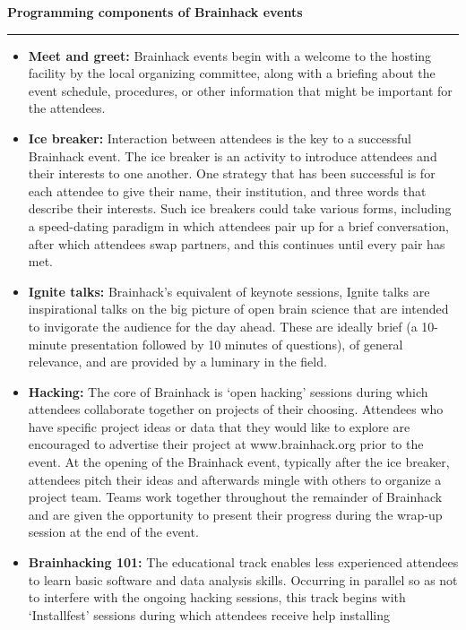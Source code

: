 \begin{table}[!ht]
\caption{{\bf Programming components of Brainhack events}\label{tab4}}
\hrule %
    \begin{itemize}
    \item
        \textbf{Meet and greet:} Brainhack events begin with a welcome to the hosting facility by the local organizing committee, along with a briefing about the event schedule, procedures, or other information that might be important for the attendees.
    \item
        \textbf{Ice breaker:} Interaction between attendees is the key to a successful Brainhack event. The ice breaker is an activity to introduce attendees and their interests %
to one another. One strategy that has been successful is for each attendee to give their name, their institution, and three words that describe their interests. Such ice breakers could take various forms, including a speed-dating paradigm in which attendees pair up for a brief conversation, after which attendees swap partners, and this continues until every pair has met.
    \item
        \textbf{Ignite talks:} Brainhack's equivalent of keynote sessions, Ignite talks are inspirational talks on the big picture of open brain science that are intended to invigorate the audience for the day ahead. These are ideally brief (a %
10-minute presentation followed by %
10 minutes of questions), of general relevance, and are provided by a luminary in the field.
    \item
        \textbf{Hacking:} The core of Brainhack is `open hacking' sessions during which attendees collaborate together on projects of their choosing. Attendees who have specific project ideas or data that they would like to explore are encouraged to advertise their project at www.brainhack.org \cite{brainhack} prior to the event. At the opening of the Brainhack event, typically after the ice breaker, attendees pitch their ideas and afterwards mingle with others to organize a project team. Teams work together throughout the remainder of Brainhack and are given the opportunity to present their progress during the wrap-up session at the end of the event.
    \item
        \textbf{Brainhacking 101:} The educational track enables less experienced attendees to learn basic software and data analysis skills. Occurring in parallel so as not to interfere with the ongoing hacking sessions, this track begins with `Installfest' sessions during which attendees receive help installing %

\end{itemize}
\end{table}
